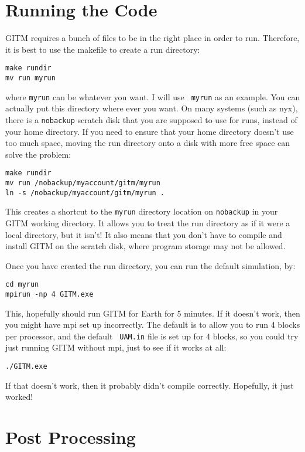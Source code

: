 \section{Running the Code}

GITM requires a bunch of files to be in the right place in order to
run.  Therefore, it is best to use the makefile to create a run
directory:
\begin{verbatim}
make rundir
mv run myrun
\end{verbatim}
where {\tt myrun} can be whatever you want.  I will use {\tt
myrun} as an example.  You can actually put this directory where ever
you want.  On many systems (such as nyx), there is a {\tt nobackup} scratch disk that
you are supposed to use for runs, instead of your home directory.  If you need to ensure that your home directory doesn't use too much space, moving the run directory onto a disk with more free space can solve the problem:

\begin{verbatim}
make rundir
mv run /nobackup/myaccount/gitm/myrun
ln -s /nobackup/myaccount/gitm/myrun .
\end{verbatim}

This creates a shortcut to the {\tt myrun} directory location on {\tt nobackup} in your GITM working directory.  It allows you to treat the run directory as if it were a local directory, but it isn't!  It also means that you don't have to compile and install GITM on the scratch disk, where program storage may not be allowed.

Once you have created the run directory, you can run the default simulation, by:

\begin{verbatim}
cd myrun
mpirun -np 4 GITM.exe
\end{verbatim}
This, hopefully should run GITM for Earth for 5 minutes.  If it
doesn't work, then you might have mpi set up incorrectly.  The default
is to allow you to run 4 blocks per processor, and the default {\tt
UAM.in} file is set up for 4 blocks, so you could try just running
GITM without mpi, just to see if it works at all:
\begin{verbatim}
./GITM.exe
\end{verbatim}
If that doesn't work, then it probably didn't compile correctly.
Hopefully, it just worked!

\section{Post Processing}
\label{post_process.sec}


